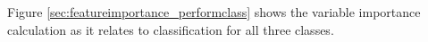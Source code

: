 Figure \ref{sec:featureimportance_performclass} shows the variable importance calculation as it relates to classification for all three classes.